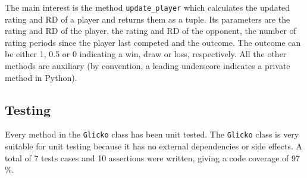 The main interest is the method \texttt{update\_player} which calculates the updated rating and RD of a player and returns them as a tuple.
Its parameters are the rating and RD of the player, the rating and RD of the opponent, the number of rating periods since the player last competed and the outcome.
The outcome can be either 1, 0.5 or 0 indicating a win, draw or loss, respectively.
All the other methods are auxiliary (by convention, a leading underscore indicates a private method in Python).

\subsection{Testing}
Every method in the \texttt{Glicko} class has been unit tested.
The \texttt{Glicko} class is very suitable for unit testing because it has no external dependencies or side effects.
A total of 7 tests cases and 10 assertions were written, giving a code coverage of 97 \%.
